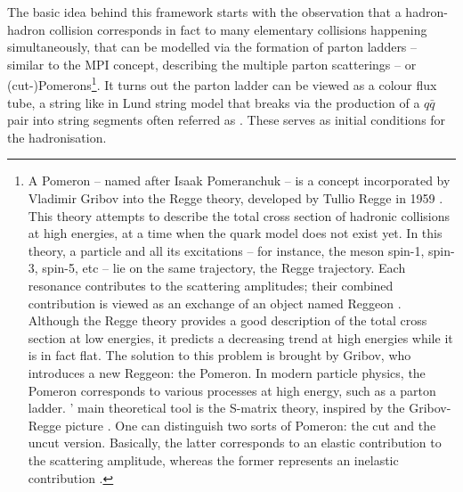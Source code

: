 The basic idea behind this framework starts with the observation that a hadron-hadron collision corresponds in fact to many elementary collisions happening simultaneously, that can be modelled via the formation of parton ladders -- similar to the MPI concept, describing the multiple parton scatterings -- or (cut-)Pomerons\footnote{A Pomeron -- named after Isaak Pomeranchuk -- is a concept incorporated by Vladimir Gribov into the Regge theory, developed by Tullio Regge in 1959 \cite{reggeIntroductionComplexOrbital1959}. This theory attempts to describe the total cross section of hadronic collisions at high energies, at a time when the quark model does not exist yet. In this theory, a particle and all its excitations -- for instance, the \rhoMes meson spin-1, spin-3, spin-5, etc -- lie on the same trajectory, the Regge trajectory. Each resonance contributes to the scattering amplitudes; their combined contribution is viewed as an exchange of an object named Reggeon \cite{levinEverythingReggeonsPart1998}. Although the Regge theory provides a good description of the total cross section at low energies, it predicts a decreasing trend at high energies while it is in fact flat. The solution to this problem is brought by Gribov, who introduces a new Reggeon: the Pomeron. In modern particle physics, the Pomeron corresponds to various processes at high energy, such as a parton ladder. \Epos' main theoretical tool is the S-matrix theory, inspired by the Gribov-Regge picture \cite{wernerCorecoronaProcedureMicrocanonical2023}. One can distinguish two sorts of Pomeron: the cut and the uncut version. Basically, the latter corresponds to an elastic contribution to the scattering amplitude, whereas the former represents an inelastic contribution \cite{wernerMonteCarloEvent2022}.}. It turns out the parton ladder can be viewed as a colour flux tube, a string like in Lund string model that breaks via the production of a $q\bar{q}$ pair into string segments often referred as . These serves as initial conditions for the hadronisation.

